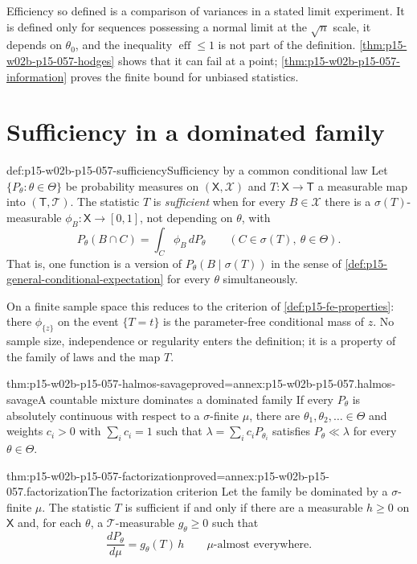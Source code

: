 Efficiency so defined is a comparison of variances in a stated limit
experiment. It is defined only for sequences possessing a normal limit at
the \(\sqrt n\) scale, it depends on \(\theta_0\), and the inequality
\(\operatorname{eff}\leq1\) is not part of the definition.
\cref{thm:p15-w02b-p15-057-hodges} shows that it can fail at a point;
\cref{thm:p15-w02b-p15-057-information} proves the finite bound for
unbiased statistics.

\section{Sufficiency in a dominated family}
\label{sec:p15-w02b-p15-057-sufficiency}

\begin{hbdefinition}{def:p15-w02b-p15-057-sufficiency}{Sufficiency by a common conditional law}
Let \(\{P_\theta:\theta\in\Theta\}\) be probability measures on
\((\mathsf X,\mathscr X)\) and \(T:\mathsf X\to\mathsf T\) a measurable map
into \((\mathsf T,\mathscr T)\). The statistic \(T\) is \emph{sufficient}
when for every \(B\in\mathscr X\) there is a
\(\sigma(T)\)-measurable \(\phi_B:\mathsf X\to[0,1]\), not depending on
\(\theta\), with
\[
 P_\theta(B\cap C)=\int_C\phi_B\,dP_\theta
 \qquad(C\in\sigma(T),\ \theta\in\Theta).
\]
That is, one function is a version of \(P_\theta(B\mid\sigma(T))\) in
the sense of \cref{def:p15-general-conditional-expectation} for every
\(\theta\) simultaneously.
\end{hbdefinition}

On a finite sample space this reduces to the criterion of
\cref{def:p15-fe-properties}: there \(\phi_{\{z\}}\) on the event
\(\{T=t\}\) is the parameter-free conditional mass of \(z\). No sample
size, independence or regularity enters the definition; it is a property
of the family of laws and the map \(T\).

\begin{hblemma}{thm:p15-w02b-p15-057-halmos-savage}{proved=annex:p15-w02b-p15-057.halmos-savage}{A countable mixture dominates a dominated family}
If every \(P_\theta\) is absolutely continuous with respect to a
\(\sigma\)-finite \(\mu\), there are \(\theta_1,\theta_2,\ldots\in\Theta\)
and weights \(c_i>0\) with \(\sum_ic_i=1\) such that
\(\lambda=\sum_ic_iP_{\theta_i}\) satisfies \(P_\theta\ll\lambda\) for
every \(\theta\in\Theta\).
\end{hblemma}

\begin{hbtheorem}{thm:p15-w02b-p15-057-factorization}{proved=annex:p15-w02b-p15-057.factorization}{The factorization criterion}
Let the family be dominated by a \(\sigma\)-finite \(\mu\). The statistic
\(T\) is sufficient if and only if there are a measurable \(h\geq0\) on
\(\mathsf X\) and, for each \(\theta\), a \(\mathscr T\)-measurable
\(g_\theta\geq0\) such that
\[
 \frac{dP_\theta}{d\mu}=g_\theta(T)\,h\qquad\mu\text{-almost everywhere}.
\]
\end{hbtheorem}

